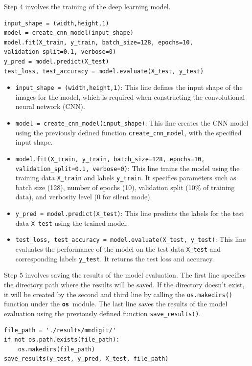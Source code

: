 \begin{step}
Step 4 involves the training of the deep learning model.
\begin{lstlisting}
input_shape = (width,height,1)
model = create_cnn_model(input_shape)
model.fit(X_train, y_train, batch_size=128, epochs=10, validation_split=0.1, verbose=0)
y_pred = model.predict(X_test)
test_loss, test_accuracy = model.evaluate(X_test, y_test)
\end{lstlisting}  

\begin{itemize}[b]
    \item \texttt{input\_shape = (width,height,1)}: This line defines the input shape of the images for the model, which is required when constructing the convolutional neural network (CNN).
    \item \texttt{model = create\_cnn\_model(input\_shape)}: This line creates the CNN model using the previously defined function \texttt{create\_cnn\_model}, with the specified input shape.
    \item \texttt{model.fit(X\_train, y\_train, batch\_size=128, epochs=10, validation\_split=0.1, verbose=0)}: This line trains the model using the training data \texttt{X\_train} and labels \texttt{y\_train}. It specifies parameters such as batch size (128), number of epochs (10), validation split (10\% of training data), and verbosity level (0 for silent mode).
    \item \texttt{y\_pred = model.predict(X\_test)}: This line predicts the labels for the test data \texttt{X\_test} using the trained model.
    \item \texttt{test\_loss, test\_accuracy = model.evaluate(X\_test, y\_test)}: This line evaluates the performance of the model on the test data \texttt{X\_test} and corresponding labels \texttt{y\_test}. It returns the test loss and accuracy.
\end{itemize}
\end{step}

\begin{step}
Step 5 involves saving the results of the model evaluation. The first line specifies the directory path where the results will be saved. If the directory doesn't exist, it will be created by the second and third line by calling the \texttt{os.makedirs()} function under the \texttt{\textbf{os }}module. The last line saves the results of the model evaluation using the previously defined function \texttt{save\_results()}.  
\begin{lstlisting}
file_path = './results/mmdigit/'
if not os.path.exists(file_path):
    os.makedirs(file_path)
save_results(y_test, y_pred, X_test, file_path)
\end{lstlisting}  
\end{step}

